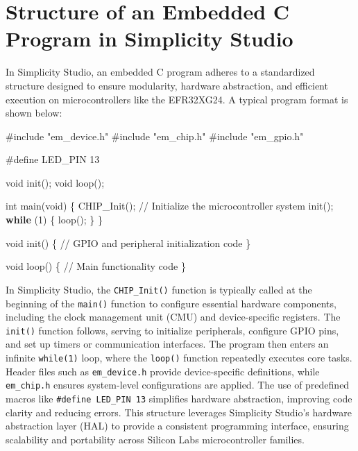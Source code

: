 \documentclass[
  9pt,
  letterpaper,
  abstract,
  titlepage]{scrbook}
\newenvironment{Shaded}{\begin{snugshade}}{\end{snugshade}}
\newcommand{\CommentTok}[1]{\textcolor[rgb]{0.37,0.37,0.37}{#1}}
\newcommand{\ControlFlowTok}[1]{\textcolor[rgb]{0.00,0.23,0.31}{\textbf{#1}}}
\newcommand{\DataTypeTok}[1]{\textcolor[rgb]{0.68,0.00,0.00}{#1}}
\newcommand{\DecValTok}[1]{\textcolor[rgb]{0.68,0.00,0.00}{#1}}
\newcommand{\ImportTok}[1]{\textcolor[rgb]{0.00,0.46,0.62}{#1}}
\newcommand{\NormalTok}[1]{\textcolor[rgb]{0.00,0.23,0.31}{#1}}
\newcommand{\OperatorTok}[1]{\textcolor[rgb]{0.37,0.37,0.37}{#1}}
\newcommand{\PreprocessorTok}[1]{\textcolor[rgb]{0.68,0.00,0.00}{#1}}
\begin{document}
\section{Structure of an Embedded C Program in Simplicity
Studio}\label{structure-of-an-embedded-c-program-in-simplicity-studio}

In Simplicity Studio, an embedded C program adheres to a standardized
structure designed to ensure modularity, hardware abstraction, and
efficient execution on microcontrollers like the EFR32XG24. A typical
program format is shown below:

\begin{Shaded}
\begin{Highlighting}[]
\PreprocessorTok{\#include }\ImportTok{"em\_device.h"}
\PreprocessorTok{\#include }\ImportTok{"em\_chip.h"}
\PreprocessorTok{\#include }\ImportTok{"em\_gpio.h"}

\PreprocessorTok{\#define LED\_PIN }\DecValTok{13}

\DataTypeTok{void}\NormalTok{ init}\OperatorTok{();}
\DataTypeTok{void}\NormalTok{ loop}\OperatorTok{();}

\DataTypeTok{int}\NormalTok{ main}\OperatorTok{(}\DataTypeTok{void}\OperatorTok{)} \OperatorTok{\{}
\NormalTok{    CHIP\_Init}\OperatorTok{();} \CommentTok{// Initialize the microcontroller system}
\NormalTok{    init}\OperatorTok{();}
    \ControlFlowTok{while} \OperatorTok{(}\DecValTok{1}\OperatorTok{)} \OperatorTok{\{}
\NormalTok{        loop}\OperatorTok{();}
    \OperatorTok{\}}
\OperatorTok{\}}

\DataTypeTok{void}\NormalTok{ init}\OperatorTok{()} \OperatorTok{\{}
    \CommentTok{// GPIO and peripheral initialization code}
\OperatorTok{\}}

\DataTypeTok{void}\NormalTok{ loop}\OperatorTok{()} \OperatorTok{\{}
    \CommentTok{// Main functionality code}
\OperatorTok{\}}
\end{Highlighting}
\end{Shaded}

In Simplicity Studio, the \texttt{CHIP\_Init()} function is typically
called at the beginning of the \texttt{main()} function to configure
essential hardware components, including the clock management unit (CMU)
and device-specific registers. The \texttt{init()} function follows,
serving to initialize peripherals, configure GPIO pins, and set up
timers or communication interfaces. The program then enters an infinite
\texttt{while(1)} loop, where the \texttt{loop()} function repeatedly
executes core tasks. Header files such as \texttt{em\_device.h} provide
device-specific definitions, while \texttt{em\_chip.h} ensures
system-level configurations are applied. The use of predefined macros
like \texttt{\#define\ LED\_PIN\ 13} simplifies hardware abstraction,
improving code clarity and reducing errors. This structure leverages
Simplicity Studio's hardware abstraction layer (HAL) to provide a
consistent programming interface, ensuring scalability and portability
across Silicon Labs microcontroller families.
\end{document}
